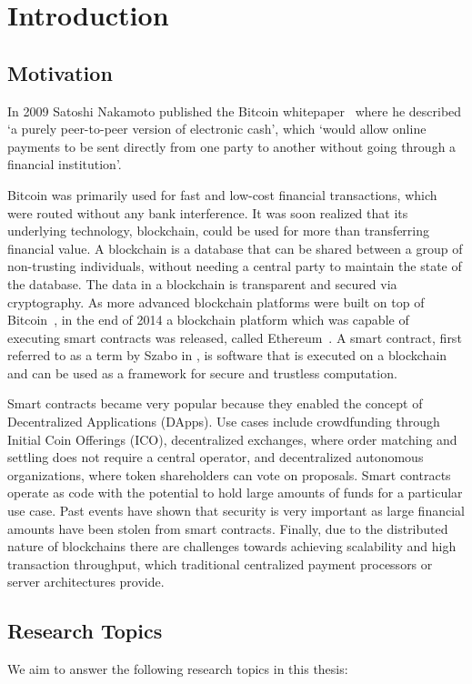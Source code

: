 \chapter{Introduction}

\section{Motivation}
In 2009 Satoshi Nakamoto published the Bitcoin whitepaper~\cite{bitcoin} where he described `a purely peer-to-peer version of electronic cash', which `would allow online payments to be sent directly from one party to another without going through a financial institution'.

Bitcoin was primarily used for fast and low-cost financial transactions, which were routed without any bank interference. It was soon realized that its underlying technology, blockchain, could be used for more than transferring financial value. A blockchain is a database that can be shared between a group of non-trusting individuals, without needing a central party to maintain the state of the database. The data in a blockchain is transparent and secured via cryptography. As more advanced blockchain platforms were built on top of Bitcoin~\cite{colored}, in the end of 2014 a blockchain platform which was capable of executing smart contracts was released, called Ethereum~\cite{vitalik}. A smart contract, first referred to as a term by Szabo in \cite{szabo}, is software that is executed on a blockchain and can be used as a framework for secure and trustless computation.

Smart contracts became very popular because they enabled the concept of Decentralized Applications (DApps). Use cases include crowdfunding through Initial Coin Offerings (ICO), decentralized exchanges, where order matching and settling does not require a central operator, and decentralized autonomous organizations, where token shareholders can vote on proposals. Smart contracts operate as code with the potential to hold large amounts of funds for a particular use case. Past events have shown that security is very important as large financial amounts have been stolen from smart contracts. Finally, due to the distributed nature of blockchains there are challenges towards achieving scalability and high transaction throughput, which traditional centralized payment processors or server architectures provide.

\section{Research Topics}
We aim to answer the following research topics in this thesis:

